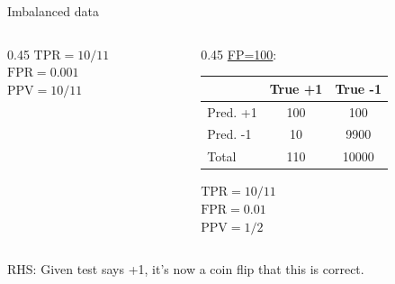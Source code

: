 \documentclass[11pt,compress,t,notes=noshow, xcolor=table]{beamer}
\begin{document}
\begin{vbframe}{Imbalanced data}
\begin{columns}
\begin{column}{0.45\textwidth}
 \medskip
 $\text{TPR} = 10/11$\\
 $\text{FPR} = 0.001$\\
 $\text{PPV} = 10/11$
\end{column}
\begin{column}{0.45\textwidth}
 \underline{FP=100}:\\
 \lz
 {
 \tiny
 \begin{tabular}{|l|c|c|}
                 \hline
                & True +1 & True -1 \\ \hline
 Pred. +1 & 100            & 100            \\ \hline
 Pred. -1 & 10            & 9900           \\ \hline
 Total  & 110            & 10000           \\ \hline
 \end{tabular}
 }

 \medskip
 $\text{TPR} = 10/11$\\
 $\text{FPR} = 0.01$\\
 $\text{PPV} = 1/2$
\end{column}
\end{columns}

\vfill

RHS: Given test says +1, it's now a coin flip that this is correct.




\framebreak


\end{vbframe}
\end{document}
